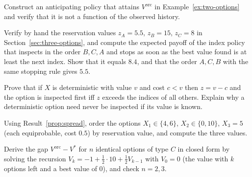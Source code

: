 \begin{exercise}
Construct an anticipating policy that attains $V^{\mathrm{orc}}$ in Example~\ref{ex:two-options} and verify that it is not a function of the observed history.
\end{exercise}

\begin{exercise}
Verify by hand the reservation values $z_A=5.5$, $z_B=15$, $z_C=8$ in Section~\ref{sec:three-options}, and compute the expected payoff of the index policy that inspects in the order $B,C,A$ and stops as soon as the best value found is at least the next index. Show that it equals $8.4$, and that the order $A,C,B$ with the same stopping rule gives $5.5$.
\end{exercise}

\begin{exercise}
Prove that if $X$ is deterministic with value $v$ and cost $c<v$ then $z=v-c$ and the option is inspected first iff $z$ exceeds the indices of all others. Explain why a deterministic option need never be inspected if its value is known.
\end{exercise}

\begin{exercise}
Using Result~\ref{prop:spread}, order the options $X_1\in\{4,6\}$, $X_2\in\{0,10\}$, $X_3=5$ (each equiprobable, cost $0.5$) by reservation value, and compute the three values.\label{ex2:reservation}
\end{exercise}

\begin{exercise}
Derive the gap $V^{\mathrm{orc}}-V^{*}$ for $n$ identical options of type $C$ in closed form by solving the recursion $V_k=-1+\tfrac12\cdot10+\tfrac12V_{k-1}$ with $V_0=0$ (the value with $k$ options left and a best value of $0$), and check $n=2,3$.
\end{exercise}



